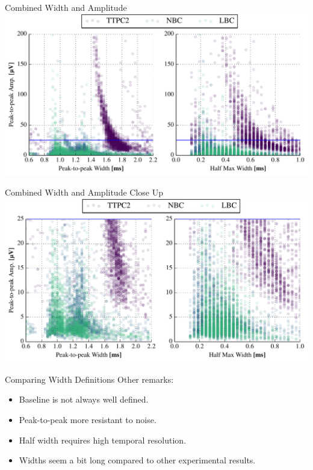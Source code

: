 \documentclass{beamer}
\begin{document}
\begin{frame}{Combined Width and Amplitude}
    \includegraphics[width=\textwidth]{images/TTPC2_NBC_LBC_IN_combined_scatter.pdf}
\end{frame}

\begin{frame}{Combined Width and Amplitude Close Up}
    \includegraphics[width=\textwidth]{images/TTPC2_NBC_LBC_IN_combined_scatter_close.pdf}
\end{frame}

\begin{frame}{Comparing Width Definitions}
    Other remarks:
    \begin{itemize}
        \item Baseline is not always well defined.
        \item Peak-to-peak more resistant to noise.
        \item Half width requires high temporal resolution.
        \item Widths seem a bit long compared to other experimental results.
    \end{itemize}
\end{frame}
\end{document}
